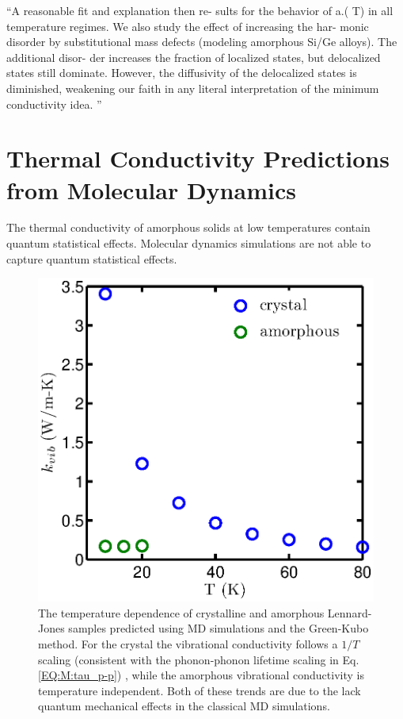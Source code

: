 \documentclass[aps,prb,preprint,superscriptaddress,amsmath,amssymb,floatfix]{revtex4}
\begin{document}
``A reasonable fit and explanation then re-
sults for the behavior of a.( T) in all temperature regimes. We also study the effect of increasing the har-
monic disorder by substitutional mass defects (modeling amorphous Si/Ge alloys). The additional disor-
der increases the fraction of localized states, but delocalized states still dominate. However, the
diffusivity of the delocalized states is diminished, weakening our faith in any literal interpretation of the
minimum conductivity idea.
'' \cite{feldman_thermal_1993}

\section{\label{S:Lifetimes}Thermal Conductivity Predictions from 
Molecular Dynamics}
The thermal conductivity of amorphous solids at low temperatures contain 
quantum statistical effects.\cite{freeman_thermal_1986} Molecular dynamics 
simulations are not able to capture quantum statistical effects.
\begin{figure}
\begin{center}
\includegraphics[scale=0.5]{LJ_amor_GK.eps}
\vspace*{-5mm}
\end{center}
\caption{\label{FIG:LJ_amor_GK}The temperature dependence of crystalline 
and amorphous Lennard-Jones samples predicted using MD simulations and the 
Green-Kubo method.\cite{mcgaughey2004a} For the crystal the vibrational 
conductivity follows a $1/T$ scaling (consistent with the phonon-phonon 
lifetime scaling in Eq$.$ \eqref{EQ:M:tau_p-p}) , while the amorphous 
vibrational conductivity is temperature independent. Both of these trends 
are due to the lack quantum mechanical effects in the classical MD 
simulations. }
\end{figure}
\end{document}
